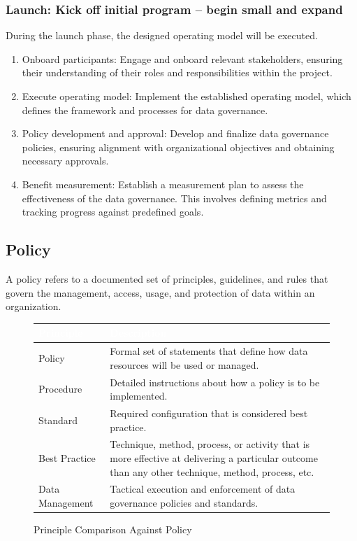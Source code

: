 \subsubsection{Launch: Kick off initial program – begin small and expand}
During the launch phase, the designed operating model will be executed. 

\begin{enumerate}
    \item Onboard participants: Engage and onboard relevant stakeholders, ensuring their understanding of their roles and responsibilities within the project.
    \item Execute operating model: Implement the established operating model, which defines the framework and processes for data governance.
    \item Policy development and approval: Develop and finalize data governance policies, ensuring alignment with organizational objectives and obtaining necessary approvals.
    \item Benefit measurement: Establish a measurement plan to assess the effectiveness of the data governance. This involves defining metrics and tracking progress against predefined goals.
\end{enumerate}

\subsection{Policy}
A policy refers to a documented set of principles, guidelines, and rules that govern the management, access, usage, and protection of data within an organization. 

\begin{figure}[H]
\begin{center}
    \renewcommand{\arraystretch}{1.5}
    \begin{tabular}{|>{\raggedright\arraybackslash}m{3cm}
                    |>{\raggedright\arraybackslash}m{11.5cm}
                    |}
    \hline
    \rowcolor[HTML]{196fb4}\centering\textcolor{white}{\large Principle} 
                            & \centering\textcolor{white}{\large Description}
                            \tabularnewline 
    \hline
    Policy & Formal set of statements that define how data resources will be used or managed. \\\hline
    Procedure & Detailed instructions about how a policy is to be implemented.\\\hline
    Standard & Required configuration that is considered best practice. \\\hline
    Best Practice & Technique, method, process, or activity that is more effective at delivering a particular outcome than any other technique, method, process, etc. \\\hline
    Data Management & Tactical execution and enforcement of data governance policies and standards. \\\hline
    \end{tabular}
\end{center}
\caption{Principle Comparison Against Policy}
\label{Policy Comparison}
\end{figure}

